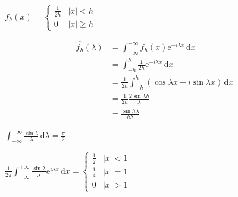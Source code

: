 \begin{example}
    $f_h(x)=\begin{cases}
            \frac{1}{2h} & |x|<h     \\
            0            & |x|\geq h
        \end{cases}$

    \begin{align*}
        \hat{f_h}(\lambda) & =\int_{-\infty}^{+\infty}f_h(x)\mathrm{e}^{-i\lambda x}\,\mathrm{d}x \\
                           & =\int_{-h}^h\frac{1}{2h}\mathrm{e}^{-i\lambda x}\,\mathrm{d}x        \\
                           & =\frac{1}{2h}\int_{-h}^h(\cos\lambda x-i\sin\lambda x)\,\mathrm{d}x  \\
                           & =\frac{1}{2h}\frac{2\sin\lambda h}{\lambda}                          \\
                           & =\frac{\sin h\lambda}{h\lambda}
    \end{align*}

    $\int_{-\infty}^{+\infty}\frac{\sin\lambda}{\lambda}\,\mathrm{d}\lambda=\frac{\pi}{2}$

    $\frac{1}{2\pi}\int_{-\infty}^{+\infty}\frac{\sin\lambda}{\lambda}\mathrm{e}^{i\lambda x}\,\mathrm{d}x=\begin{cases}
            \frac{1}{2} & |x|<1 \\
            \frac{1}{4} & |x|=1 \\
            0           & |x|>1
        \end{cases}$
\end{example}

